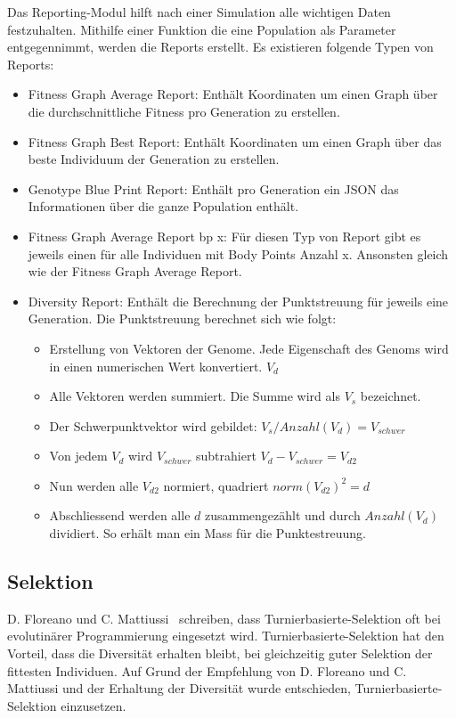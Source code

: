       Das Reporting-Modul hilft nach einer Simulation alle wichtigen Daten festzuhalten.
      Mithilfe einer Funktion die eine Population als Parameter entgegennimmt,
      werden die Reports erstellt. Es existieren folgende Typen von Reports:
      \begin{itemize}
        \item Fitness Graph Average Report: Enthält Koordinaten um einen Graph über die durchschnittliche Fitness pro Generation zu erstellen.
        \item Fitness Graph Best Report: Enthält Koordinaten um einen Graph über das beste Individuum der Generation zu erstellen.
        \item Genotype Blue Print Report: Enthält pro Generation ein \gls{JSON} das Informationen über die ganze Population enthält.
        \item Fitness Graph Average Report bp x: Für diesen Typ von Report gibt es jeweils einen für alle Individuen mit Body Points Anzahl x.
              Ansonsten gleich wie der Fitness Graph Average Report.
        \item Diversity Report: Enthält die Berechnung der Punktstreuung für jeweils eine Generation. Die Punktstreuung berechnet sich wie folgt:
        \begin{itemize}
          \item Erstellung von Vektoren der Genome. Jede Eigenschaft des Genoms wird in einen numerischen Wert konvertiert. \( V_d \)
          \item Alle Vektoren werden summiert.  Die Summe wird als \(V_s\) bezeichnet.
          \item Der Schwerpunktvektor wird gebildet: \( V_s / Anzahl(V_d) = V_{schwer} \)
          \item Von jedem \(V_d\) wird \(V_{schwer}\) subtrahiert  \( V_d - V_{schwer}  = V_{d2} \)
          \item Nun werden alle \(V_{d2}\) normiert, quadriert \( norm{(V_{d2})}^2 = d \)
          \item Abschliessend werden alle \(d\) zusammengezählt und durch \(Anzahl(V_d)\) dividiert. So erhält man ein Mass für die Punktestreuung.
        \end{itemize}
      \end{itemize}

    \subsection{Selektion\label{sec:Selektion}}
      D. Floreano und C. Mattiussi~\cite[S.33]{book:bioInspired} schreiben, dass Turnierbasierte-Selektion oft bei evolutinärer Programmierung eingesetzt wird.
      Turnierbasierte-Selektion hat den Vorteil, dass die Diversität erhalten bleibt,
      bei gleichzeitig guter Selektion der fittesten Individuen.
      Auf Grund der Empfehlung von D. Floreano und C. Mattiussi und der Erhaltung der Diversität wurde entschieden, Turnierbasierte-Selektion einzusetzen.
